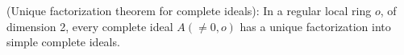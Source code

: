 (Unique factorization theorem for complete ideals): In a regular local ring $o$, of dimension 2, every complete ideal $A(\neq 0, o)$ has a unique factorization into simple complete ideals.